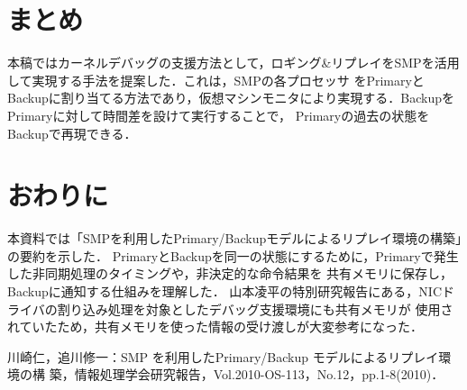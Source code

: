 \documentclass[12pt]{jsarticle}
\begin{document}
\section{まとめ}
本稿ではカーネルデバッグの支援方法として，ロギング\&リプレイをSMPを活用して実現する手法を提案した．これは，SMPの各プロセッサ
をPrimaryとBackupに割り当てる方法であり，仮想マシンモニタにより実現する．BackupをPrimaryに対して時間差を設けて実行することで，
Primaryの過去の状態をBackupで再現できる．
\section{おわりに}
本資料では「SMPを利用したPrimary/Backupモデルによるリプレイ環境の構築」の要約を示した．
PrimaryとBackupを同一の状態にするために，Primaryで発生した非同期処理のタイミングや，非決定的な命令結果を
共有メモリに保存し，Backupに通知する仕組みを理解した．
山本凌平の特別研究報告にある，NICドライバの割り込み処理を対象としたデバッグ支援環境にも共有メモリが
使用されていたため，共有メモリを使った情報の受け渡しが大変参考になった．

\begin{thebibliography}{9}
 川崎仁，追川修一：SMP を利用したPrimary/Backup モデルによるリプレイ環境の構
築，情報処理学会研究報告，Vol.2010-OS-113，No.12，pp.1-8(2010)．
\end{thebibliography}
\end{document}

